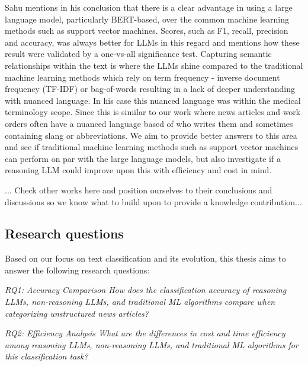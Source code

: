 


Sahu \cite{sahu2025language} mentions in his conclusion that there is a clear advantage in using a large language model, particularly BERT-based, over the common machine learning methods such as support vector machines. Scores, such as F1, recall, precision and accuracy, was always better for LLMs in this regard and mentions how these result were validated by a one-vs-all significance test. Capturing semantic relationships within the text is where the LLMs shine compared to the traditional machine learning methods which rely on term frequency - inverse document frequency (TF-IDF) or bag-of-words resulting in a lack of deeper understanding with nuanced language. In his case this nuanced language was within the medical terminology scope. Since this is similar to our work where news articles and work orders often have a nuanced language based of who writes them and sometimes containing slang or abbreviations. We aim to provide better answers to this area and see if traditional machine learning methods such as support vector machines can perform on par with the large language models, but also investigate if a reasoning LLM could improve upon this with efficiency and cost in mind.

... Check other works here and position ourselves to their conclusions and discussions so we know what to build upon to provide a knowledge contribution...

\subsection{Research questions}

Based on our focus on text classification and its evolution, this thesis aims to answer the following research questions:

\bigskip
\textit{RQ1: Accuracy Comparison
\newline
How does the classification accuracy of reasoning LLMs, non-reasoning LLMs, and traditional ML algorithms compare when categorizing unstructured news articles?}

\bigskip
\textit{RQ2: Efficiency Analysis
\newline
What are the differences in cost and time efficiency among reasoning LLMs, non-reasoning LLMs, and traditional ML algorithms for this classification task?}


